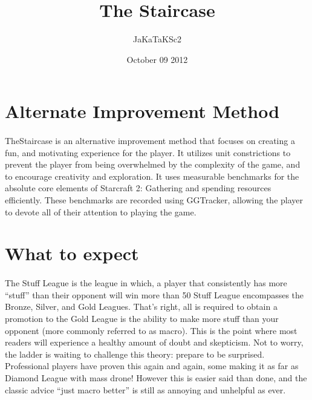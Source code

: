 \documentclass{article}
\title{The Staircase}
\date{October 09 2012}
\author{JaKaTaKSc2}
\begin{document}
\maketitle\newpage
\tableofcontents\newpage
\section{Alternate Improvement Method}
\paragraph{}
TheStaircase is an alternative improvement method that focuses on creating a
fun, and motivating experience for the player. It utilizes unit constrictions to
prevent the player from being overwhelmed by the complexity of the game, and to
encourage creativity and exploration. It uses measurable benchmarks for the
absolute core elements of Starcraft 2: Gathering and spending resources
efficiently. These benchmarks are recorded using GGTracker, allowing the player
to devote all of their attention to playing the game.


\section{What to expect}
\paragraph{}
The Stuff League is the league in which, a player that consistently has more
“stuff” than their opponent will win more than 50%
Stuff League encompasses the Bronze, Silver, and Gold Leagues. That’s right, all
is required to obtain a promotion to the Gold League is the ability to make more
stuff than your opponent (more commonly referred to as macro). This is the point
where most readers will experience a healthy amount of doubt and skepticism. Not
to worry, the ladder is waiting to challenge this theory: prepare to be 
surprised. Professional players have proven this again and again, some making
it as far as Diamond League with mass drone! However this is easier said than
done, and the classic advice “just macro better” is still as annoying and
unhelpful as ever.
\end{document}
